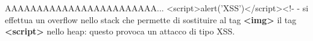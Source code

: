 \documentclass{beamer}
\begin{document}
\begin{frame}
\begin{columns}
\begin{column}{0.5\textwidth}
      \newline\newline\newline
      AAAAAAAAAAAAAAAAAAAAAAAA...
      <script>alert('XSS')</script><!- -
      \newline\newline\newline
      \pause
      si effettua un overflow nello stack che permette di sostituire al tag
      \textbf{<img>} il tag \textbf{<script>} nello heap: questo provoca un attacco di
      tipo XSS.
      \newline\newline\newline

    \end{column}

  \end{columns}
\end{frame}
\end{document}
